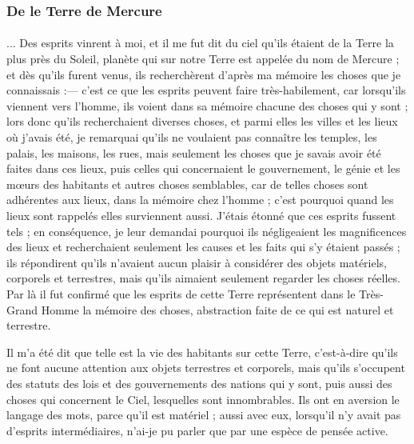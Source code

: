 \documentclass[a4paper, 11pt, oneside]{article}
\begin{document}
\subsubsection{De le Terre de Mercure}
\paragraph{}
... Des esprits vinrent à moi, et il me fut dit du ciel qu'ils étaient de la Terre la plus près du Soleil, planète qui sur notre Terre est appelée du nom de Mercure ; et dès qu'ils furent venus, ils recherchèrent d'après ma mémoire les choses que je connaissais :--- c'est ce que les esprits peuvent faire très-habilement, car lorsqu'ils viennent vers l'homme, ils voient dans sa mémoire chacune des choses qui y sont ; lors donc qu'ils recherchaient diverses choses, et parmi elles les villes et les lieux où j'avais été, je remarquai qu'ils ne voulaient pas connaître les temples, les palais, les maisons, les rues, mais seulement les choses que je savais avoir été faites dans ces lieux, puis celles qui concernaient le gouvernement, le génie et les mœurs des habitants et autres choses semblables, car de telles choses sont adhérentes aux lieux, dans la mémoire chez l'homme ; c'est pourquoi quand les lieux sont rappelés elles surviennent aussi. J'étais étonné que ces esprits fussent tels ; en conséquence, je leur demandai pourquoi ils négligeaient les magnificences des lieux et recherchaient seulement les causes et les faits qui s'y étaient passés ; ils répondirent qu'ils n'avaient aucun plaisir à considérer des objets matériels, corporels et terrestres, mais qu'ils aimaient seulement regarder les choses réelles. Par là il fut confirmé que les esprits de cette Terre représentent dans le Très-Grand Homme la mémoire des choses, abstraction faite de ce qui est naturel et terrestre.

Il m'a été dit que telle est la vie des habitants sur cette Terre, c'est-à-dire qu'ils ne font aucune attention aux objets terrestres et corporels, mais qu'ils s'occupent des statuts des lois et des gouvernements des nations qui y sont, puis aussi des choses qui concernent le Ciel, lesquelles sont innombrables. Ils ont en aversion le langage des mots, parce qu'il est matériel ; aussi avec eux, lorsqu'il n'y avait pas d'esprits intermédiaires, n'ai-je pu parler que par une espèce de pensée active.
\end{document}
